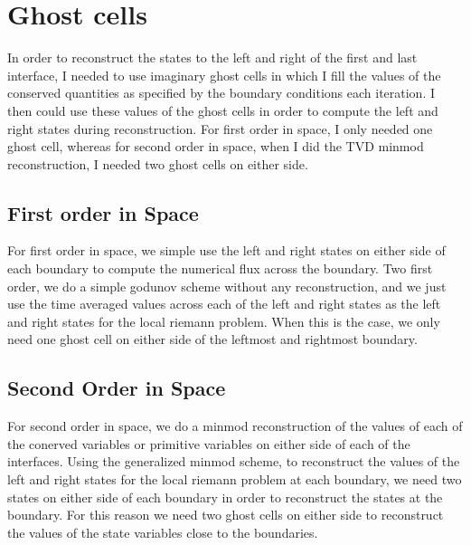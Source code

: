 \section{Ghost cells}
In order to reconstruct the states to the left and right of the first and last interface, I needed to use imaginary ghost cells in which I fill the values of the conserved quantities as specified by the boundary conditions each iteration. I then could use these values of the ghost cells in order to compute the left and right states during reconstruction. For first order in space, I only needed one ghost cell, whereas for second order in space, when I did the TVD minmod reconstruction, I needed two ghost cells on either side.
\subsection{First order in Space}
For first order in space, we simple use the left and right states on either side of each boundary to compute the numerical flux across the boundary. Two first order, we do a simple godunov scheme without any reconstruction, and we just use the time averaged values across each of the left and right states as the left and right states for the local riemann problem. When this is the case, we only need one ghost cell on either side of the leftmost and rightmost boundary. 
\subsection{Second Order in Space}
For second order in space, we do a minmod reconstruction of the values of each of the conerved variables or primitive variables on either side of each of the interfaces. Using the generalized minmod scheme, to reconstruct the values of the left and right states for the local riemann problem at each boundary, we need two states on either side of each boundary in order to reconstruct the states at the boundary. For this reason we need two ghost cells on either side to reconstruct the values of the state variables close to the boundaries. 
